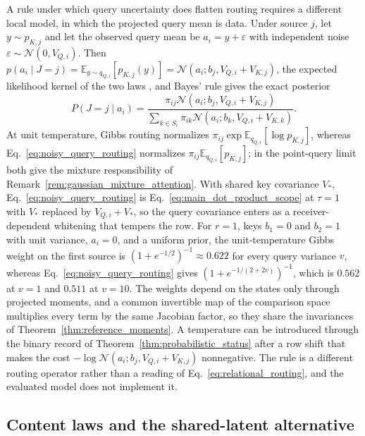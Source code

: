 \documentclass[twoside,11pt]{article}
\begin{document}
\begin{remark}
\label{rem:noisy_query}
A rule under which query uncertainty does flatten routing requires a different local model, in which the projected query mean is data. Under source $j$, let $y\sim p_{K,j}$ and let the observed query mean be $a_i=y+\varepsilon$ with independent noise $\varepsilon\sim\mathcal N(0,V_{Q,i})$. Then $p(a_i\mid J=j)=\mathbb E_{y\sim q_{Q,i}}[p_{K,j}(y)]=\mathcal N(a_i;b_j,V_{Q,i}+V_{K,j})$, the expected likelihood kernel of the two laws \citep[Secs.~2.1 and~3.1]{Jebara2004ProbabilityProduct}, and Bayes' rule gives the exact posterior
\begin{equation}
P(J=j\mid a_i)=\frac{\pi_{ij}\mathcal N(a_i;b_j,V_{Q,i}+V_{K,j})}{\sum_{k\in S_i}\pi_{ik}\mathcal N(a_i;b_k,V_{Q,i}+V_{K,k})}.
\label{eq:noisy_query_routing}
\end{equation}
At unit temperature, Gibbs routing normalizes $\pi_{ij}\exp\mathbb E_{q_{Q,i}}[\log p_{K,j}]$, whereas Eq.~\eqref{eq:noisy_query_routing} normalizes $\pi_{ij}\mathbb E_{q_{Q,i}}[p_{K,j}]$; in the point-query limit both give the mixture responsibility of Remark~\ref{rem:gaussian_mixture_attention}. With shared key covariance $V_*$, Eq.~\eqref{eq:noisy_query_routing} is Eq.~\eqref{eq:main_dot_product_scope} at $\tau=1$ with $V_*$ replaced by $V_{Q,i}+V_*$, so the query covariance enters as a receiver-dependent whitening that tempers the row. For $r=1$, keys $b_1=0$ and $b_2=1$ with unit variance, $a_i=0$, and a uniform prior, the unit-temperature Gibbs weight on the first source is $(1+e^{-1/2})^{-1}\approx0.622$ for every query variance $v$, whereas Eq.~\eqref{eq:noisy_query_routing} gives $(1+e^{-1/(2+2v)})^{-1}$, which is $0.562$ at $v=1$ and $0.511$ at $v=10$. The weights depend on the states only through projected moments, and a common invertible map of the comparison space multiplies every term by the same Jacobian factor, so they share the invariances of Theorem~\ref{thm:reference_moments}. A temperature can be introduced through the binary record of Theorem~\ref{thm:probabilistic_status} after a row shift that makes the cost $-\log\mathcal N(a_i;b_j,V_{Q,i}+V_{K,j})$ nonnegative. The rule is a different routing operator rather than a reading of Eq.~\eqref{eq:relational_routing}, and the evaluated model does not implement it.
\end{remark}

\subsection{Content laws and the shared-latent alternative}
\label{sec:content_laws}
\end{document}
